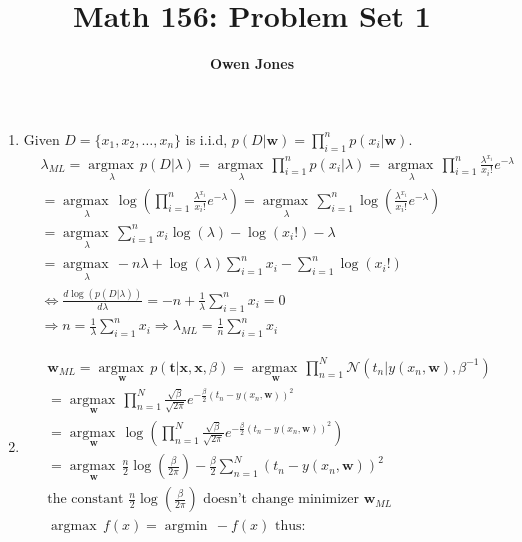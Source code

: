 \documentclass[10pt]{article}
\title{\bf Math 156: Problem Set 1}
\author{\bf Owen Jones}
\DeclareMathOperator*{\argmax}{argmax\,}
\DeclareMathOperator*{\argmin}{argmin\,}
\begin{document}
\maketitle
\begin{enumerate}
    \item Given $D=\{x_1,x_2,\ldots,x_n\}$ is i.i.d, $\displaystyle p(D|\mathbf{w})=\prod_{i=1}^{n}p(x_i|\mathbf{w})$.
    \begin{align*}
        &\lambda_{ML}=\underset{\lambda}{\argmax}p(D|\lambda)
        =\underset{\lambda}{\argmax}\prod_{i=1}^{n}p(x_i|\lambda)
        =\underset{\lambda}{\argmax}\prod_{i=1}^{n}\frac{\lambda^{x_i}}{x_i!}e^{-\lambda}\\
        &=\underset{\lambda}{\argmax}\log(\prod_{i=1}^{n}\frac{\lambda^{x_i}}{x_i!}e^{-\lambda})
        =\underset{\lambda}{\argmax}\sum_{i=1}^{n}\log(\frac{\lambda^{x_i}}{x_i!}e^{-\lambda})\\
        &=\underset{\lambda}{\argmax}\sum_{i=1}^{n}x_i\log(\lambda)-\log(x_i!)-\lambda\\
        &=\underset{\lambda}{\argmax}-n\lambda+\log(\lambda)\sum_{i=1}^{n}x_i-\sum_{i=1}^{n}\log(x_i!)\\
        &\Leftrightarrow \frac{d \log(p(D|\lambda))}{d\lambda}=-n+\frac{1}{\lambda}\sum_{i=1}^{n}x_i=0\\
        &\Rightarrow n=\frac{1}{\lambda}\sum_{i=1}^{n}x_i\Rightarrow \lambda_{ML}=\frac{1}{n}\sum_{i=1}^{n}x_i
    \end{align*}
    \item \begin{align*}
        &\mathbf{w}_{ML}=\underset{\mathbf{w}}{\argmax}p(\mathbf{t}|\mathbf{x},\mathbf{x},\beta)
        =\underset{\mathbf{w}}{\argmax}\prod_{n=1}^{N}\mathcal{N}(t_n|y(x_n,\mathbf{w}),\beta^{-1})\\
        &=\underset{\mathbf{w}}{\argmax}\prod_{n=1}^{N}\frac{\sqrt{\beta}}{\sqrt{2\pi}}e^{-\frac{\beta}{2}{(t_n-y(x_n,\mathbf{w}))}^2}\\
        &=\underset{\mathbf{w}}{\argmax}\log(\prod_{n=1}^{N}\frac{\sqrt{\beta}}{\sqrt{2\pi}}e^{-\frac{\beta}{2}{(t_n-y(x_n,\mathbf{w}))}^2})\\
        &=\underset{\mathbf{w}}{\argmax}\frac{n}{2}\log(\frac{\beta}{2\pi})-\frac{\beta}{2}\sum_{n=1}^{N}{(t_n-y(x_n,\mathbf{w}))}^2\\
        &\text{the constant }\frac{n}{2}\log(\frac{\beta}{2\pi})\text{ doesn't change minimizer }\mathbf{w}_{ML}\\
        &\argmax f(x)=\argmin-f(x) \text{ thus:}\\

\end{align*}
\end{enumerate}
\end{document}
